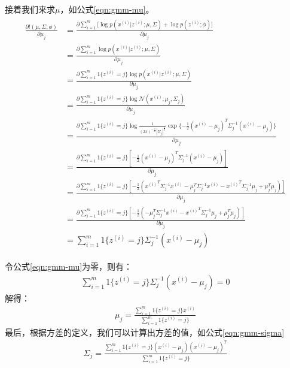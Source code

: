 接着我们来求$\mu$，如公式\ref{eqn:gmm-mu}。
\begin{align}
\label{eqn:gmm-mu}
\begin{split}
  \frac{\partial l(\mu,\Sigma,\phi)}{\partial \mu_j}
  &=\frac{\partial \sum_{i=1}^{m} \Big[\log p(x^{(i)}|z^{(i)};\mu,\Sigma) + \log p(z^{(i)};\phi) \Big]}{\partial \mu_j} \\
  &= \frac{\partial \sum_{i=1}^{m}\log p(x^{(i)}|z^{(i)};\mu,\Sigma)}{\partial \mu_j} \\
  &= \frac{\partial \sum_{i=1}^{m} 1\{z^{(i)}=j\} \log p(x^{(i)}|z^{(i)};\mu,\Sigma)}{\partial \mu_j} \\
  &= \frac{\partial \sum_{i=1}^{m} 1\{z^{(i)}=j\} \log{\mathcal{N}(x^{(i)}; \mu_j, \Sigma_j)} }{\partial \mu_j} \\
  &= \frac{\partial \sum_{i=1}^{m} 1\{z^{(i)}=j\} \log \frac{1}{(2\pi)^{-\frac{n}{2}}|\Sigma_j|^{\frac{1}{2}}} \exp{\{-\frac{1}{2}(x^{(i)}-\mu_j)^{T}\Sigma_j^{-1}(x^{(i)}-\mu_j)\}} }{\partial \mu_j} \\
  &= \frac{\partial \sum_{i=1}^{m} 1\{z^{(i)}=j\} [-\frac{1}{2}(x^{(i)}-\mu_j)^{T}\Sigma_j^{-1}(x^{(i)}-\mu_j)]}{\partial \mu_j} \\
  &= \frac{\partial \sum_{i=1}^{m} 1\{z^{(i)}=j\} [-\frac{1}{2}({x^{(i)}}^{T}\Sigma_j^{-1}{x^{(i)}} - \mu_j^{T}\Sigma_j^{-1}x^{(i)} - {x^{(i)}}^{T}\Sigma_j^{-1}\mu_j + \mu_j^{T}\mu_j)]}{\partial \mu_j} \\
  &= \frac{\partial \sum_{i=1}^{m} 1\{z^{(i)}=j\} [-\frac{1}{2}(-\mu_j^{T}\Sigma_j^{-1}{x^{(i)}} - {x^{(i)}}^{T}\Sigma_j^{-1}\mu_j + \mu_j^{T}\mu_j)]}{\partial \mu_j} \\
  &= \sum_{i=1}^{m} 1\{z^{(i)}=j\}\Sigma_j^{-1} ( {x^{(i)}} - \mu_j) 
\end{split}
\end{align}

令公式\ref{eqn:gmm-mu}为零，则有：
\begin{align}
\label{eqn:gmm-mu1}
\sum_{i=1}^{m} 1\{z^{(i)}=j\}\Sigma_j^{-1} ({x^{(i)}} - \mu_j) = 0
\end{align}
解得：
\begin{align}
\label{eqn:gmm-mu2}
\mu_j = \frac{\sum_{i=1}^{m} 1\{z^{(i)}=j\} x^{(i)}}{\sum_{i=1}^{m} 1\{z^{(i)}=j\}}
\end{align}
最后，根据方差的定义，我们可以计算出方差的值，如公式\ref{eqn:gmm-sigma}
\begin{align}
\label{eqn:gmm-sigma}
\Sigma_j = \frac{\sum_{i=1}^{m} 1\{z^{(i)}=j\} (x^{(i)}-\mu_j)(x^{(i)}-\mu_j)^{T}}{\sum_{i=1}^{m} 1\{z^{(i)}=j\}}
\end{align}

